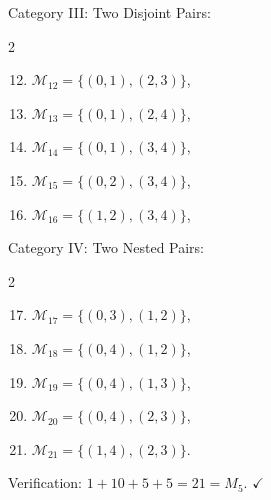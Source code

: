 \documentclass[runningheads]{llncs}
\begin{document}
Category III: Two Disjoint Pairs:
\begin{multicols}{2}
\begin{enumerate}
  \setcounter{enumi}{11}
  \item $\mathcal{M}_{12} = \{(0,1), (2,3)\}$,
  \item $\mathcal{M}_{13} = \{(0,1), (2,4)\}$,
  \item $\mathcal{M}_{14} = \{(0,1), (3,4)\}$,
  \item $\mathcal{M}_{15} = \{(0,2), (3,4)\}$,
  \item $\mathcal{M}_{16} = \{(1,2), (3,4)\}$,
\end{enumerate}
\end{multicols}

Category IV: Two Nested Pairs:
\begin{multicols}{2}
\begin{enumerate}
  \setcounter{enumi}{16}
  \item $\mathcal{M}_{17} = \{(0,3), (1,2)\}$,
  \item $\mathcal{M}_{18} = \{(0,4), (1,2)\}$,
  \item $\mathcal{M}_{19} = \{(0,4), (1,3)\}$,
  \item $\mathcal{M}_{20} = \{(0,4), (2,3)\}$,
  \item $\mathcal{M}_{21} = \{(1,4), (2,3)\}$.
\end{enumerate}
\end{multicols}
Verification: $1 + 10 + 5 + 5 = 21 = M_5$. \quad $\checkmark$
\end{document}
